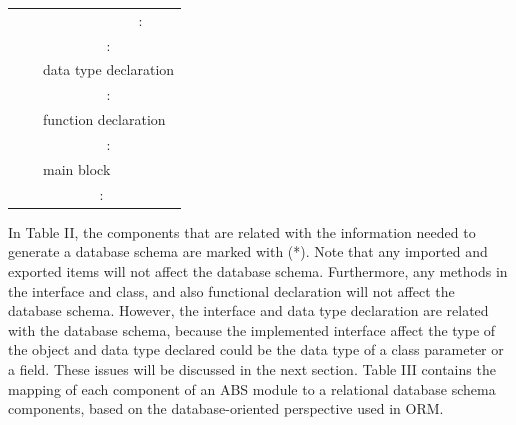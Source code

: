 \documentclass[conference]{IEEEtran}
\begin{document}
\begin{table}[]
\begin{tabular}{|l|l|l|l|l|}
		&                          &                            & \multicolumn{2}{c|}{:}                     \\ \cline{3-5} 
		&                          & \multicolumn{3}{c|}{:}                                                  \\ \cline{3-5} 
		&                          & \multicolumn{3}{l|}{data type declaration}                              \\ \cline{3-5} 
		&                          & \multicolumn{3}{c|}{:}                                                  \\ \cline{3-5} 
		&                          & \multicolumn{3}{l|}{function declaration}                               \\ \cline{3-5} 
		&                          & \multicolumn{3}{c|}{:}                                                  \\ \cline{3-5} 
		&                          & \multicolumn{3}{l|}{main block}                                         \\ \cline{2-5} 
		& \multicolumn{4}{c|}{:}                                                                             \\ \hline
	\end{tabular}
\end{table}

In Table II, the components that are related with the information needed to generate a database schema are marked with (*). Note that any imported and exported items will not affect the database schema. Furthermore, any methods in the interface and class, and also functional declaration will not affect the database schema. However, the interface and data type declaration are related with the database schema, because the implemented interface affect the type of the object and data type declared could be the data type of a class parameter or a field. These issues will be discussed in the next section. Table III contains the mapping of each component of an ABS module to a relational database schema components, based on the database-oriented perspective used in ORM. 
\end{document}
